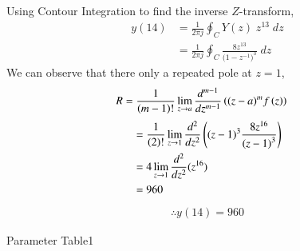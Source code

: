 \documentclass[journal,12pt,twocolumn]{IEEEtran}
\theoremstyle{remark}
\begin{document}
 Using Contour Integration to find the inverse $Z$-transform,
\begin{align}
    y(14)&=\frac{1}{2\pi j}\oint_{C}Y(z) \;z^{13} \;dz  \\
    &=\frac{1}{2\pi j}\oint_{C}\frac{8z^{13}}{({1-z^{-1})}^{3}} \;dz 
\end{align}
We can observe that there only a repeated pole at $z=1$,
\begin{align}
    R&=\frac{1}{\left(m-1\right)!}\lim\limits_{z\to a}\frac{d^{m-1}}{dz^{m-1}}\left({(z-a)}^{m}f\left(z\right)\right)  
\end{align}
\begin{align}
    &=\frac{1}{\left(2\right)!}\lim\limits_{z\to 1}\frac{d^{2}}{dz^{2}}\left({(z-1)}^{3}\frac{8z^{16}}{{(z-1)}^3}\right)   \\
    &=4\lim\limits_{z\to 1}\frac{d^2}{dz^2}(z^{16})   \\
    &=960
\end{align}
\begin{align}
    \therefore \boxed{y(14)=960}
\end{align}
\begin{table}[ht]
    \centering
    \def\arraystretch{1.5}
    
    \caption{Parameter Table1}
    \label{tab:10.5.3.1}
\end{table}
\end{document}
